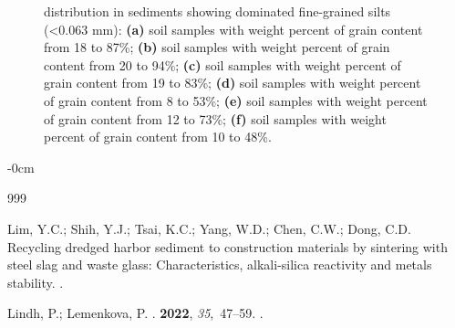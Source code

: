\documentclass[sustainability,article,accept,pdftex,moreauthors]{Definitions/mdpi}
\begin{document}
{{\begin{figure}[H]
{%
 distribution in sediments showing dominated fine-grained silts (<0.063 mm): \textbf{(a)} soil samples with weight percent of grain content from 18 to 87\%; \textbf{(b)} soil samples with weight percent of grain content from 20 to 94\%; \textbf{(c)} soil samples with weight percent of grain content from 19 to 83\%; \textbf{(d)} soil samples with weight percent of grain content from 8 to 53\%; \textbf{(e)} soil samples with weight percent of grain content from 12 to 73\%; \textbf{(f)} soil samples with weight percent of grain content from 10 to 48\%.}\label{figA1}
\end{figure}

\begin{adjustwidth}{-\extralength}{0cm}


%
\begin{thebibliography}{999}

Lim, Y.C.; Shih, Y.J.; Tsai, K.C.; Yang, W.D.; Chen, C.W.; Dong, C.D.
\newblock Recycling dredged harbor sediment to construction materials by
  sintering with steel slag and waste glass: Characteristics, alkali-silica
  reactivity and metals stability.
.

Lindh, P.; Lemenkova, P.
.
 {\bf 2022}, {\em 35},~47--59.
.


\end{thebibliography}
\end{adjustwidth}}}
\end{document}

